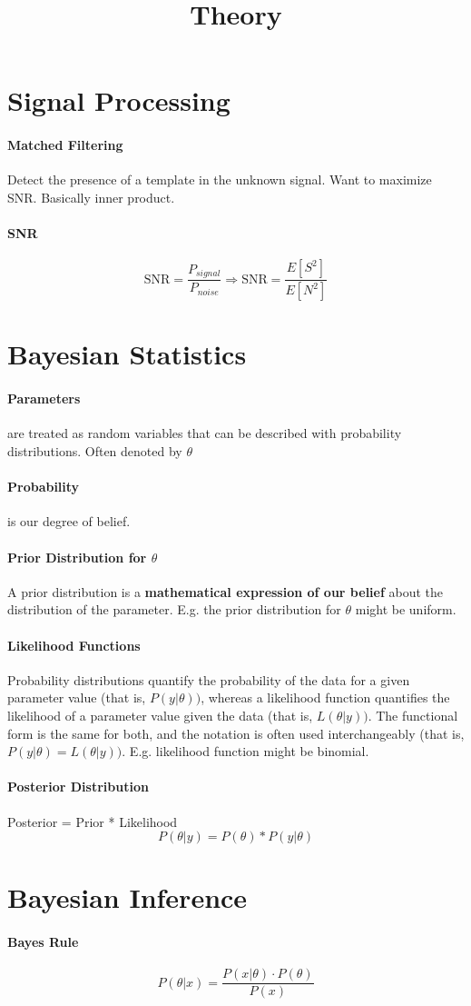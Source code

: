 \documentclass[12pt]{article}
\title{Theory}
\begin{document}
\maketitle

\section{Signal Processing}
\paragraph{Matched Filtering} Detect the presence of a template in the
unknown signal. Want to maximize SNR. Basically inner product.

\paragraph{SNR}
\[
  \text{SNR} = \frac{P_{signal}}{P_{noise}} 
  \Rightarrow \text{SNR} = \frac{E[S^2]}{E[N^2]}
\]


\section{Bayesian Statistics}
\paragraph{Parameters} are treated as random variables that can be described with
probability distributions. Often denoted by $\theta$

\paragraph{Probability} is our degree of belief.

\paragraph{Prior Distribution for $\theta$}  A prior distribution is a
\textbf{mathematical expression of our belief} about the distribution of the
parameter. E.g. the prior distribution for $\theta$ might be uniform.

\paragraph{Likelihood Functions} Probability distributions quantify the
probability of the data for a given parameter value (that is, $P(y|\theta))$,
whereas a likelihood function quantifies the likelihood of a parameter value
given the data (that is, $L(\theta|y))$. The functional form is the same for
both, and the notation is often used interchangeably (that is, $P(y|\theta) =
L(\theta|y))$. E.g. likelihood function might be binomial.

\paragraph{Posterior Distribution} Posterior = Prior * Likelihood
\[
  P(\theta | y) = P(\theta) * P(y | \theta)
\]

\section{Bayesian Inference}
\paragraph{Bayes Rule}
\[
  P(\theta | x) = \frac{P(x|\theta) \cdot P(\theta)}{P(x) }
\]
\end{document}
